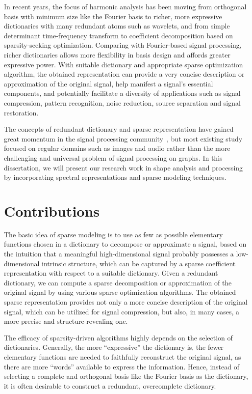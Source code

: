 In recent years, the focus of harmonic analysis has been moving from orthogonal 
basis with minimum size like the Fourier basis to richer, more expressive 
dictionaries with many redundant atoms such as wavelets, and from simple 
determinant time-frequency transform to coefficient decomposition based on 
sparsity-seeking optimization. Comparing with Fourier-based signal processing,
richer dictionaries allows more flexibility in basis design and affords greater 
expressive power. With suitable dictionary and appropriate sparse optimization 
algorithm, the obtained representation can provide a very concise description or 
approximation of the original signal, help manifest a signal's essential 
components, and potentially facilitate a diversity of applications such as signal 
compression, pattern recognition, noise reduction, source separation and signal 
restoration.

The concepts of redundant dictionary and sparse representation have gained great momentum
in the signal processing community~\cite{Mallat2008}, but most existing study focused on 
regular domains such as images and audio rather than the more challenging and universal 
problem of signal processing on graphs. In this dissertation, we will present our research 
work in shape analysis and processing by incorporating spectral representations and sparse 
modeling techniques.

\section{Contributions}

The basic idea of sparse modeling is to use as few as possible elementary functions chosen
in a dictionary to decompose or approximate a signal, based on the intuition that a meaningful
high-dimensional signal probably possesses a low-dimensional intrinsic structure, which can be
captured by a sparse coefficient representation with respect to a suitable dictionary. Given a
redundant dictionary, we can compute a sparse decomposition or approximation of the original signal
by using various sparse optimization algorithms. The obtained sparse representation provides not
only a more concise description of the original signal, which can be utilized for signal compression,
but also, in many cases, a more precise and structure-revealing one.

The efficacy of sparsity-driven algorithms highly depends on the selection of dictionaries.
Generally, the more ``expressive'' the dictionary is, the fewer elementary functions
are needed to faithfully reconstruct the original signal, as there are more ``words''
available to express the information. Hence, instead of selecting a complete and orthogonal basis
like the Fourier basis as the dictionary, it is often desirable to construct a redundant, overcomplete
dictionary.

